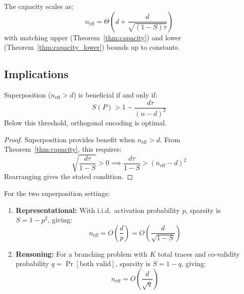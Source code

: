 \begin{corollary}
\label{cor:tight}
The capacity scales as:
\begin{equation}
n_{\text{eff}} = \Theta\left(d + \frac{d}{\sqrt{(1-S)\tau}}\right)
\end{equation}
with matching upper (Theorem~\ref{thm:capacity}) and lower (Theorem~\ref{thm:capacity_lower}) bounds up to constants.
\end{corollary}

\subsection{Implications}

\begin{corollary}
\label{cor:critical}
Superposition ($n_{\text{eff}} > d$) is beneficial if and only if:
\begin{equation}
S(P) > 1 - \frac{d\tau}{(n-d)^2}
\end{equation}
Below this threshold, orthogonal encoding is optimal.
\end{corollary}

\begin{proof}
Superposition provides benefit when $n_{\text{eff}} > d$. From Theorem~\ref{thm:capacity}, this requires:
\begin{equation}
\sqrt{\frac{d\tau}{1-S}} > 0 \implies \frac{d\tau}{1-S} > (n_{\text{eff}} - d)^2
\end{equation}
Rearranging gives the stated condition.
\end{proof}

\begin{corollary}
\label{cor:scaling}
For the two superposition settings:
\begin{enumerate}
    \item[(a)] \textbf{Representational:} With i.i.d.\ activation probability $p$, sparsity is $S = 1 - p^2$, giving:
    \begin{equation}
    n_{\text{eff}} = O\left(\frac{d}{p}\right) = O\left(\frac{d}{\sqrt{1-S}}\right)
    \end{equation}

    \item[(b)] \textbf{Reasoning:} For a branching problem with $K$ total traces and co-validity probability $q = \Pr[\text{both valid}]$, sparsity is $S = 1 - q$, giving:
    \begin{equation}
    n_{\text{eff}} = O\left(\frac{d}{\sqrt{q}}\right)
    \end{equation}
\end{enumerate}
\end{corollary}

